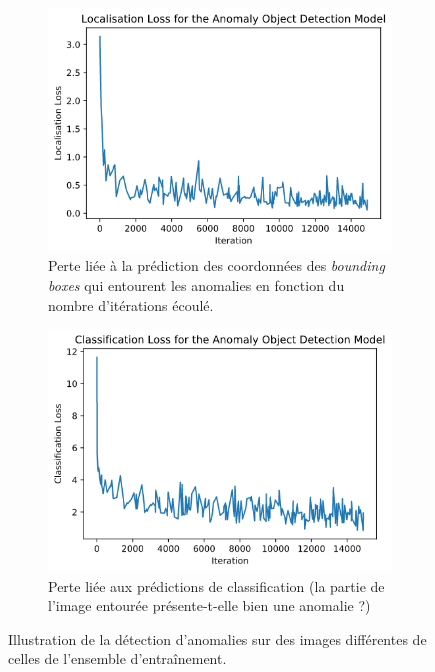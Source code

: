 \documentclass[french]{article}
\theoremstyle{mytheoremstyle}
\theoremstyle{mytheoremstyle}
\theoremstyle{myproblemstyle}
\begin{document}
    \begin{figure}[H]
    \centering
    \begin{subfigure}[t]{0.5\textwidth}
            \centering
            \includegraphics[width=1\textwidth]{images/od_loc_loss.png}
            \caption{Perte liée à la prédiction des coordonnées des \emph{bounding boxes} qui entourent les anomalies en fonction du nombre d'itérations écoulé.}
    \end{subfigure}%
    \begin{subfigure}[t]{0.5\textwidth}
            \centering
            \includegraphics[width=1\textwidth]{images/od_cla_loss.png}
           	\caption{Perte liée aux prédictions de classification (la partie de l'image entourée présente-t-elle bien une anomalie ?)}
    \end{subfigure}
    \caption{Illustration de la détection d'anomalies sur des images différentes de celles de l'ensemble d'entraînement.}
    \end{figure}
    
\end{document}
